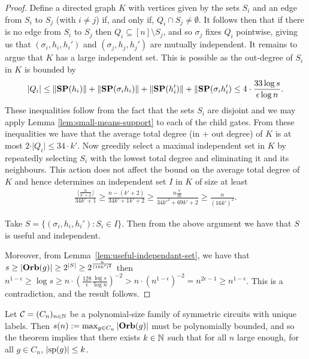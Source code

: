 \documentclass[../paper.tex]{subfiles}
\begin{document}
\begin{proof}
  Define a directed graph $K$ with vertices given by the sets $S_i$ and an edge
  from $S_i$ to $S_j$ (with $i \neq j$) if, and only if, $Q_i \cap S_j \neq
  \emptyset$. It follows then that if there is no edge from $S_i$ to $S_j$ then
  $Q_i \subseteq [n]\setminus S_j$, and so $\sigma_j$ fixes $Q_i$ pointwise,
  giving us that $(\sigma_i, h_i, h_i')$ and $(\sigma_j, h_j, h_j')$ are
  mutually independent. It remains to argue that $K$ has a large independent
  set. This is possible as the out-degree of $S_i$ in $K$ is bounded by
  \begin{align*}
    \vert Q_i \vert \leq \|\text{\textbf{SP}}(h_i) \| + \|\text{\textbf{SP}}(\sigma_i h_i) \| + \|\text{\textbf{SP}}(h_i') \| + \|\text{\textbf{SP}}(\sigma_i h_i') \leq 4 \cdot \frac{33\log s}{\epsilon \log n}.
  \end{align*}
  These inequalities follow from the fact that the sets $S_i$ are disjoint and
  we may apply Lemma \ref{lem:small-means-support} to each of the child gates.
  From these inequalities we have that the average total degree (in + out
  degree) of $K$ is at most $2 \cdot \vert Q_i \vert \leq 34 \cdot k'$. Now
  greedily select a maximal independent set in $K$ by repeatedly selecting $S_i$
  with the lowest total degree and eliminating it and its neighbours. This
  action does not affect the bound on the average total degree of $K$ and hence
  determines an independent set $I$ in $K$ of size at least
  \begin{align*}
    \frac{\lfloor \frac{n}{k' + 2} \rfloor}{34k' + 1} \geq \frac{n - (k'+2)}{34k'+1k'+2} \geq \frac{n\frac{7}{16}}{34k'^2 + 69k' +2} \geq \frac{n}{(16k')^2}.
  \end{align*}

  Take $S = \{(\sigma_i, h_i, h_i') : S_i \in I \}$. Then from the above
  argument we have that $S$ is useful and independent.
  
  Moreover, from Lemma~\ref{lem:useful-independant-set}, we have that $s \geq
  \vert \text{\textbf{Orb}}(g) \vert \geq 2^{\vert S \vert} \geq 2^{\frac{n}{(16k')^2}}$ then
  $n^{1-\epsilon} \geq \log s \geq n \cdot (\frac{128}{\epsilon}\frac{\log
    s}{\log n})^{-2} > n \cdot (n^{1-\epsilon})^{-2} = n^{2\epsilon -1} \geq
  n^{1-\epsilon}$. This is a contradiction, and the result follows.
\end{proof}
 
Let $\mathcal{C} = (C_n)_{n \in \mathbb{N}}$ be a polynomial-size family of symmetric
circuits with unique labels. Then $s(n) := \max_{g \in C_n} \vert \text{\textbf{Orb}} (g)\vert$
must be polynomially bounded, and so the theorem implies that there exists $k
\in \mathbb{N}$ such that for all $n$ large enough, for all $g \in C_n$, $\vert
\text{sp}(g) \vert \leq k$.
\end{document}
